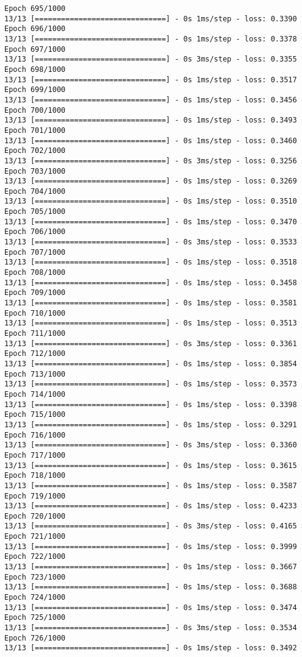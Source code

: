 \documentclass[11pt]{article}
\begin{document}
\begin{Verbatim}[commandchars=\\\{\}]
Epoch 695/1000
13/13 [==============================] - 0s 1ms/step - loss: 0.3390
Epoch 696/1000
13/13 [==============================] - 0s 1ms/step - loss: 0.3378
Epoch 697/1000
13/13 [==============================] - 0s 3ms/step - loss: 0.3355
Epoch 698/1000
13/13 [==============================] - 0s 1ms/step - loss: 0.3517
Epoch 699/1000
13/13 [==============================] - 0s 1ms/step - loss: 0.3456
Epoch 700/1000
13/13 [==============================] - 0s 1ms/step - loss: 0.3493
Epoch 701/1000
13/13 [==============================] - 0s 1ms/step - loss: 0.3460
Epoch 702/1000
13/13 [==============================] - 0s 3ms/step - loss: 0.3256
Epoch 703/1000
13/13 [==============================] - 0s 1ms/step - loss: 0.3269
Epoch 704/1000
13/13 [==============================] - 0s 1ms/step - loss: 0.3510
Epoch 705/1000
13/13 [==============================] - 0s 1ms/step - loss: 0.3470
Epoch 706/1000
13/13 [==============================] - 0s 3ms/step - loss: 0.3533
Epoch 707/1000
13/13 [==============================] - 0s 1ms/step - loss: 0.3518
Epoch 708/1000
13/13 [==============================] - 0s 1ms/step - loss: 0.3458
Epoch 709/1000
13/13 [==============================] - 0s 1ms/step - loss: 0.3581
Epoch 710/1000
13/13 [==============================] - 0s 1ms/step - loss: 0.3513
Epoch 711/1000
13/13 [==============================] - 0s 3ms/step - loss: 0.3361
Epoch 712/1000
13/13 [==============================] - 0s 1ms/step - loss: 0.3854
Epoch 713/1000
13/13 [==============================] - 0s 1ms/step - loss: 0.3573
Epoch 714/1000
13/13 [==============================] - 0s 1ms/step - loss: 0.3398
Epoch 715/1000
13/13 [==============================] - 0s 1ms/step - loss: 0.3291
Epoch 716/1000
13/13 [==============================] - 0s 3ms/step - loss: 0.3360
Epoch 717/1000
13/13 [==============================] - 0s 1ms/step - loss: 0.3615
Epoch 718/1000
13/13 [==============================] - 0s 1ms/step - loss: 0.3587
Epoch 719/1000
13/13 [==============================] - 0s 1ms/step - loss: 0.4233
Epoch 720/1000
13/13 [==============================] - 0s 3ms/step - loss: 0.4165
Epoch 721/1000
13/13 [==============================] - 0s 1ms/step - loss: 0.3999
Epoch 722/1000
13/13 [==============================] - 0s 1ms/step - loss: 0.3667
Epoch 723/1000
13/13 [==============================] - 0s 1ms/step - loss: 0.3688
Epoch 724/1000
13/13 [==============================] - 0s 1ms/step - loss: 0.3474
Epoch 725/1000
13/13 [==============================] - 0s 3ms/step - loss: 0.3534
Epoch 726/1000
13/13 [==============================] - 0s 1ms/step - loss: 0.3492

\end{Verbatim}
\end{document}
